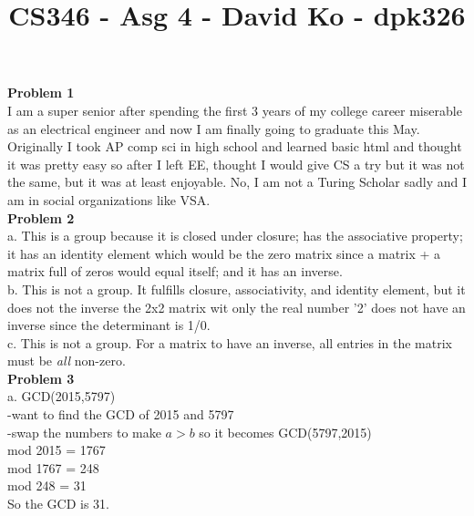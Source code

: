 \documentclass[10pt]{article}
\title{CS346 - Asg 4 - David Ko - dpk326}
\begin{document}
\date{}
\maketitle

\noindent \large \textbf{Problem 1}\\
\indent I am a super senior after spending the first 3 years of my college career miserable as an electrical engineer and now I am finally going to graduate this May. Originally I took AP comp sci in high school and learned basic html and thought it was pretty easy so after I left EE,  thought I would give CS a try but it was not the same, but it was at least enjoyable. No, I am not a Turing Scholar sadly and I am in social organizations like VSA.\\

\noindent \large \textbf{Problem 2}\\
a. This is a group because it is closed under closure; has the associative property; it has an identity element which would be the zero matrix since a matrix + a matrix full of zeros would equal itself; and it has an inverse.\\

\noindent b. This is not a group. It fulfills closure, associativity, and identity element, but it does not the inverse the 2x2 matrix wit only the real number '2' does not have an inverse since the determinant is 1/0.\\

\noindent c. This is not a group. For a matrix to have an inverse, all entries in the matrix must be \emph{all} non-zero.\\


\noindent \large \textbf{Problem 3}\\
a. GCD(2015,5797)\\
\indent -want to find the GCD of 2015 and 5797\\
\indent -swap the numbers to make $a>b$ so it becomes GCD(5797,2015)\\
 mod 2015 = 1767\\
 mod 1767 = 248\\
 mod 248 = 31\\
\indent So the GCD is 31.\\
\end{document}

